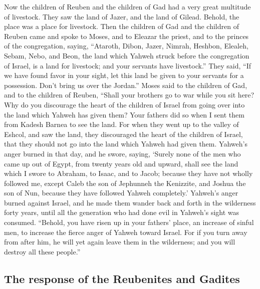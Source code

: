  Now the children of Reuben and the children of Gad had a
very great multitude of livestock. They saw the land of Jazer, and the
land of Gilead. Behold, the place was a place for livestock.
 Then the children of Gad and the children of Reuben came
and spoke to Moses, and to Eleazar the priest, and to the princes of the
congregation, saying,  ``Ataroth, Dibon, Jazer, Nimrah,
Heshbon, Elealeh, Sebam, Nebo, and Beon,  the land which
Yahweh struck before the congregation of Israel, is a land for
livestock; and your servants have livestock.''  They said,
``If we have found favor in your sight, let this land be given to your
servants for a possession. Don't bring us over the Jordan.''
 Moses said to the children of Gad, and to the children of
Reuben, ``Shall your brothers go to war while you sit here?
 Why do you discourage the heart of the children of Israel
from going over into the land which Yahweh has given them?
 Your fathers did so when I sent them from Kadesh Barnea
to see the land.  For when they went up to the valley of
Eshcol, and saw the land, they discouraged the heart of the children of
Israel, that they should not go into the land which Yahweh had given
them.  Yahweh's anger burned in that day, and he swore,
saying,  `Surely none of the men who came up out of
Egypt, from twenty years old and upward, shall see the land which I
swore to Abraham, to Isaac, and to Jacob; because they have not wholly
followed me,  except Caleb the son of Jephunneh the
Kenizzite, and Joshua the son of Nun, because they have followed Yahweh
completely.'  Yahweh's anger burned against Israel, and
he made them wander back and forth in the wilderness forty years, until
all the generation who had done evil in Yahweh's sight was consumed.
 ``Behold, you have risen up in your fathers' place, an
increase of sinful men, to increase the fierce anger of Yahweh toward
Israel.  For if you turn away from after him, he will yet
again leave them in the wilderness; and you will destroy all these
people.''

\hypertarget{the-response-of-the-reubenites-and-gadites}{%
\subsection{The response of the Reubenites and
Gadites}\label{the-response-of-the-reubenites-and-gadites}}


